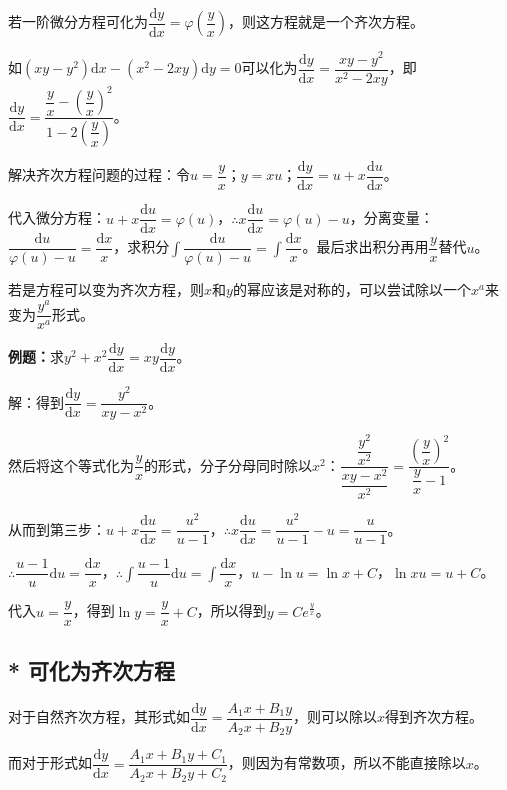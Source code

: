 \documentclass[UTF8, 12pt]{ctexart}
\begin{document}
若一阶微分方程可化为$\dfrac{\textrm{d}y}{\textrm{d}x}=\varphi\left(\dfrac{y}{x}\right)$，则这方程就是一个齐次方程。

如$(xy-y^2)\textrm{d}x-(x^2-2xy)\textrm{d}y=0$可以化为$\dfrac{\textrm{d}y}{\textrm{d}x}=\dfrac{xy-y^2}{x^2-2xy}$，即$\dfrac{\textrm{d}y}{\textrm{d}x}=\dfrac{\dfrac{y}{x}-\left(\dfrac{y}{x}\right)^2}{1-2\left(\dfrac{y}{x}\right)}$。

解决齐次方程问题的过程：令$u=\dfrac{y}{x}$；$y=xu$；$\dfrac{\textrm{d}y}{\textrm{d}x}=u+x\dfrac{\textrm{d}u}{\textrm{d}x}$。

代入微分方程：$u+x\dfrac{\textrm{d}u}{\textrm{d}x}=\varphi(u)$，$\therefore x\dfrac{\textrm{d}u}{\textrm{d}x}=\varphi(u)-u$，分离变量：$\dfrac{\textrm{d}u}{\varphi(u)-u}=\dfrac{\textrm{d}x}{x}$，求积分$\displaystyle{\int\dfrac{\textrm{d}u}{\varphi(u)-u}=\int\dfrac{\textrm{d}x}{x}}$。最后求出积分再用$\dfrac{y}{x}$替代$u$。

若是方程可以变为齐次方程，则$x$和$y$的幂应该是对称的，可以尝试除以一个$x^a$来变为$\dfrac{y^a}{x^a}$形式。

\textbf{例题：}求$y^2+x^2\dfrac{\textrm{d}y}{\textrm{d}x}=xy\dfrac{\textrm{d}y}{\textrm{d}x}$。

解：得到$\dfrac{\textrm{d}y}{\textrm{d}x}=\dfrac{y^2}{xy-x^2}$。

然后将这个等式化为$\dfrac{y}{x}$的形式，分子分母同时除以$x^2$：$\dfrac{\dfrac{y^2}{x^2}}{\dfrac{xy-x^2}{x^2}}=\dfrac{\left(\dfrac{y}{x}\right)^2}{\dfrac{y}{x}-1}$。

从而到第三步：$u+x\dfrac{\textrm{d}u}{\textrm{d}x}=\dfrac{u^2}{u-1}$，$\therefore x\dfrac{\textrm{d}u}{\textrm{d}x}=\dfrac{u^2}{u-1}-u=\dfrac{u}{u-1}$。

$\therefore\dfrac{u-1}{u}\textrm{d}u=\dfrac{\textrm{d}x}{x}$，$\therefore\displaystyle{\int\dfrac{u-1}{u}\textrm{d}u=\int\dfrac{\textrm{d}x}{x}}$，$u-\ln u=\ln x+C$，$\ln xu=u+C$。

代入$u=\dfrac{y}{x}$，得到$\ln y=\dfrac{y}{x}+C$，所以得到$y=Ce^{\frac{y}{x}}$。

\subsection{* 可化为齐次方程}

对于自然齐次方程，其形式如$\dfrac{\textrm{d}y}{\textrm{d}x}=\dfrac{A_1x+B_1y}{A_2x+B_2y}$，则可以除以$x$得到齐次方程。

而对于形式如$\dfrac{\textrm{d}y}{\textrm{d}x}=\dfrac{A_1x+B_1y+C_1}{A_2x+B_2y+C_2}$，则因为有常数项，所以不能直接除以$x$。
\end{document}
